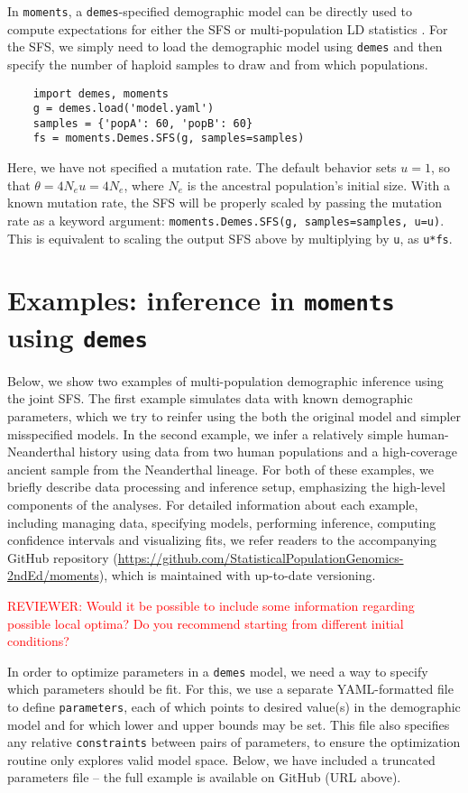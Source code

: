 \documentclass[]{article}
\newcommand{\reviewercomment}[1]{{\textcolor{red}{REVIEWER: #1}}}
\newcommand{\moments}{\texttt{moments}\xspace}
\newcommand{\demes}{\texttt{demes}\xspace}
\begin{document}
In \moments, a \demes-specified demographic model can be directly used to
compute expectations for either the SFS or multi-population LD statistics
\cite{ragsdale2019models, ragsdale2020unbiased}. For the SFS, we simply need
to load the demographic model using \demes and then specify the number of
haploid samples to draw and from which populations.
\begin{verbatim}
    import demes, moments
    g = demes.load('model.yaml')
    samples = {'popA': 60, 'popB': 60}
    fs = moments.Demes.SFS(g, samples=samples)
\end{verbatim}
Here, we have not specified a mutation rate. The default behavior sets $u=1$,
so that $\theta = 4N_eu=4N_e$, where $N_e$ is the ancestral population's
initial size. With a known mutation rate, the SFS will be properly scaled by
passing the mutation rate as a keyword argument: \texttt{moments.Demes.SFS(g,
samples=samples, u=u)}. This is equivalent to scaling the output SFS above by
multiplying by \texttt{u}, as \texttt{u*fs}.

\section*{Examples: inference in \moments using \demes}

Below, we show two examples of multi-population demographic inference using the
joint SFS. The first example simulates data with known demographic parameters,
which we try to reinfer using the both the original model and simpler
misspecified models. In the second example, we infer a relatively simple
human-Neanderthal history using data from two human populations and a
high-coverage ancient sample from the Neanderthal lineage. For both of these
examples, we briefly describe data processing and inference setup, emphasizing
the high-level components of the analyses. For detailed information about each
example, including managing data, specifying models, performing inference,
computing confidence intervals and visualizing fits, we refer readers to the
accompanying GitHub repository
(\url{https://github.com/StatisticalPopulationGenomics-2ndEd/moments}), which
is maintained with up-to-date versioning.

\reviewercomment{Would it be possible to include some information regarding possible local optima? Do you recommend starting from different initial conditions?}

In order to optimize parameters in a \demes model, we need a way to specify
which parameters should be fit. For this, we use a separate YAML-formatted file
to define \texttt{parameters}, each of which points to desired value(s) in the
demographic model and for which lower and upper bounds may be set. This file
also specifies any relative \texttt{constraints} between pairs of parameters,
to ensure the optimization routine only explores valid model space. Below, we
have included a truncated parameters file -- the full example is available on
GitHub (URL above).
\end{document}
